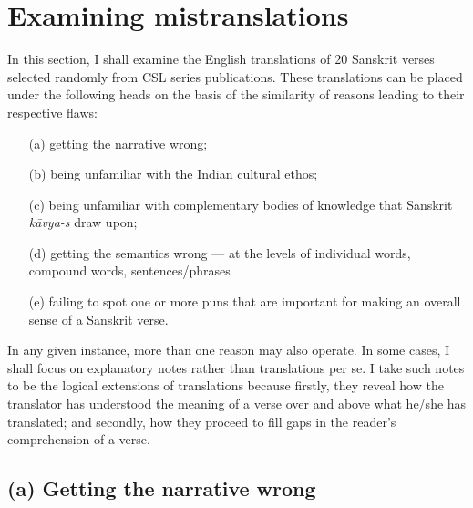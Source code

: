 \section*{Examining mistranslations}

In this section, I shall examine the English translations of 20 Sanskrit verses selected randomly from CSL series publications. These translations can be placed under the following heads on the basis of the similarity of reasons leading to their respective flaws: 
\begin{itemize}
\itemsep=1pt
\item[(a)] getting the narrative wrong; 
\item[(b)] being unfamiliar with the Indian cultural ethos; 
\item[(c)] being unfamiliar with complementary bodies of knowledge that Sanskrit \textsl{kāvya-s} draw upon; 
\item[(d)] getting the semantics wrong --- at the levels of individual words, compound words, sentences/phrases 
\item[(e)] failing to spot one or more puns that are important for making an overall sense of a Sanskrit verse. 
\end{itemize}

In any given instance, more than one reason may also operate. In some cases, I shall focus on explanatory notes rather than translations per se. I take such notes to be the logical extensions of translations because firstly, they reveal how the translator has understood the meaning of a verse over and above what he/she has translated; and secondly, how they proceed to fill gaps in the reader’s comprehension of a verse. 

\subsection*{(a) Getting the narrative wrong} 

